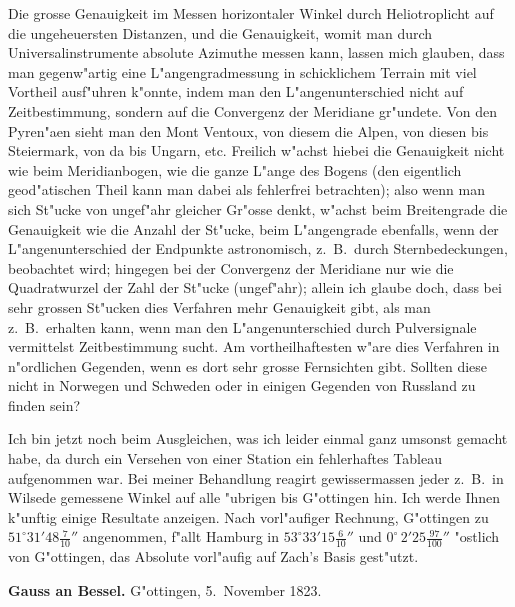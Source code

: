 \documentclass[12pt,a4paper]{article}
\theoremstyle{plain}
\theoremstyle{definition}
\theoremstyle{remark}
\begin{document}
\newpage
\noindent Die grosse Genauigkeit im Messen horizontaler Winkel durch Heliotroplicht auf die ungeheuersten Distanzen, und die Genauigkeit, womit man durch Universalinstrumente absolute Azimuthe messen kann, lassen mich glauben, dass man gegenw"artig eine L"angengradmessung in schicklichem Terrain mit viel Vortheil ausf"uhren k"onnte, indem man den L"angenunterschied nicht auf Zeitbestimmung, sondern auf die Convergenz der Meridiane gr"undete. Von den Pyren"aen sieht man den Mont Ventoux, von diesem die Alpen, von diesen bis Steiermark, von da bis Ungarn, etc. Freilich w"achst hiebei die Genauigkeit nicht wie beim Meridianbogen, wie die ganze L"ange des Bogens (den eigentlich geod"atischen Theil kann man dabei als fehlerfrei betrachten); also wenn man sich St"ucke von ungef"ahr gleicher Gr"osse denkt, w"achst beim Breitengrade die Genauigkeit wie die Anzahl der St"ucke, beim L"angengrade ebenfalls, wenn der L"angenunterschied der Endpunkte astronomisch, z.~B.\ durch Sternbedeckungen, beobachtet wird; hingegen bei der Convergenz der Meridiane nur wie die Quadratwurzel der Zahl der St"ucke (ungef"ahr); allein ich glaube doch, dass bei sehr grossen St"ucken dies Verfahren mehr Genauigkeit gibt, als man z.~B.\ erhalten kann, wenn man den L"angenunterschied durch Pulversignale vermittelst Zeitbestimmung sucht. Am vortheilhaftesten w"are dies Verfahren in n"ordlichen Gegenden, wenn es dort sehr grosse Fernsichten gibt. Sollten diese nicht in Norwegen und Schweden oder in einigen Gegenden von Russland zu finden sein?

\medskip
\noindent Ich bin jetzt noch beim Ausgleichen, was ich leider einmal ganz umsonst gemacht habe, da durch ein Versehen von einer Station ein fehlerhaftes Tableau aufgenommen war. Bei meiner Behandlung reagirt gewissermassen jeder z.~B.\ in Wilsede gemessene Winkel auf alle "ubrigen bis G"ottingen hin. Ich werde Ihnen k"unftig einige Resultate anzeigen. Nach vorl"aufiger Rechnung, G"ottingen zu $51^{\circ}31'48\frac{7}{10}''$ angenommen, f"allt Hamburg in $53^{\circ}33'15\frac{6}{10}''$ und $0^{\circ}\,2'25\frac{97}{100}''$ "ostlich von G"ottingen, das Absolute vorl"aufig auf Zach's Basis gest"utzt.

\newpage
\noindent \textbf{Gauss an Bessel.} G"ottingen, 5.~November 1823.
\end{document}
